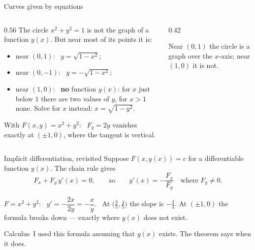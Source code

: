 \documentclass[10pt]{wosm-slides}
\begin{document}
\begin{frame}{Curves given by equations}
  \begin{columns}[c]
    \begin{column}{0.56\textwidth}
      The circle $x^2 + y^2 = 1$ is not the graph of a function $y(x)$. But near most of its points
      it is:
      \begin{itemize}
        \item near $(0, 1)$: \ $y = \sqrt{1 - x^2}$;
        \item near $(0, -1)$: \ $y = -\sqrt{1 - x^2}$;
        \item near $(1, 0)$: \ \textbf{no} function $y(x)$: for $x$ just below $1$ there are two
          values of $y$, for $x > 1$ none. Solve for $x$ instead: $x = \sqrt{1 - y^2}$.
      \end{itemize}
      \pause
      With $F(x, y) = x^2 + y^2$: \ $F_y = 2y$ vanishes exactly at $(\pm 1, 0)$, where the tangent is
      vertical.
    \end{column}
    \begin{column}{0.42\textwidth}
      \centering
      \par\small Near $(0, 1)$ the circle is a graph over the $x$-axis; near $(1, 0)$ it is not.
    \end{column}
  \end{columns}
\end{frame}

\begin{frame}{Implicit differentiation, revisited}
  Suppose $F(x, y(x)) = c$ for a differentiable function $y(x)$. The chain rule gives
  \[ F_x + F_y\, y'(x) = 0, \qquad\text{so}\qquad y'(x) = -\frac{F_x}{F_y} \quad\text{where } F_y \ne 0 . \]
  \pause
  \begin{example}
    $F = x^2 + y^2$: \ $y' = -\dfrac{2x}{2y} = -\dfrac xy$. \ At $\bigl(\frac35, \frac45\bigr)$ the slope is
    $-\frac34$. At $(\pm 1, 0)$ the formula breaks down --- exactly where $y(x)$ does not exist.
  \end{example}
  \pause
  Calculus~I used this formula assuming that $y(x)$ exists. The theorem says when it does.
\end{frame}
\end{document}
